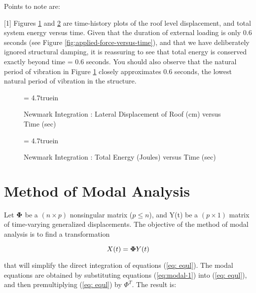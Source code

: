 \vspace{0.15 in}\noindent
Points to note are:

\vspace{0.10 in}
\begin{description}
\item{[1]}
Figures \ref{fig: shear-displacement-versus-time} and \ref{fig: shear-energy-versus-time}
are time-history plots of the roof level displacement,
and total system energy versus time.
Given that the duration of external loading is only 0.6
seconds (see Figure \ref{fig:applied-force-versus-time}),
and that we have deliberately ignored structural damping, 
it is reassuring to see that total energy is conserved exactly
beyond time = 0.6 seconds. You should also observe that the natural
period of vibration in Figure \ref{fig: shear-displacement-versus-time}
closely approximates 0.6 seconds,
the lowest natural period of vibration in the structure.
\end{description}

\clearpage
\begin{figure}[ht]
\epsfxsize= 4.7truein
\centerline{}
\caption{Newmark Integration : Lateral Displacement of Roof (cm) versus Time (sec)}
\label{fig: shear-displacement-versus-time}
\end{figure}

\begin{figure}[h]
\epsfxsize= 4.7truein
\centerline{}
\caption{Newmark Integration : Total Energy (Joules) versus Time (sec)}
\label{fig: shear-energy-versus-time}
\end{figure}

\clearpage
\section{Method of Modal Analysis}

\vspace{0.15 in}
\noindent\hspace{0.50 in}
Let ${\bf \Phi}$ be a $(n \times p)$ nonsingular matrix ($p \le n$),
and Y(t) be a $(p \times 1)$ matrix of time-varying generalized displacements.
The objective of the method of modal analysis is to
find a transformation

\begin{equation}
X(t) = {\bf \Phi} Y(t)
\label{eq:modal-1}
\end{equation}

\vspace{0.15 in}\noindent
that will simplify the direct integration of equations (\ref{eq: equl}).
The modal equations are obtained by substituting
equations (\ref{eq:modal-1}) into (\ref{eq: equl}),
and then premultiplying (\ref{eq: equl}) by $\Phi^T$.
The result is:

